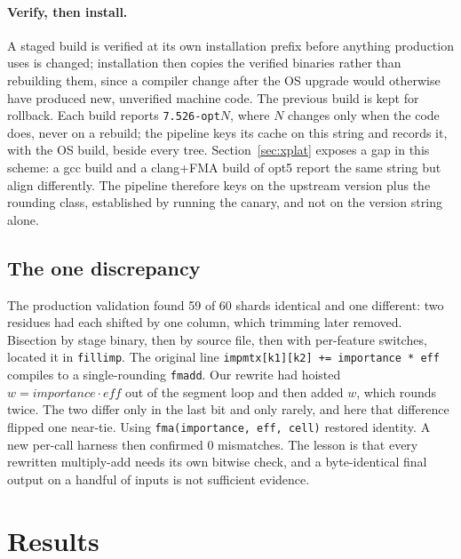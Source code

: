 \documentclass[11pt]{article}
\newcommand{\code}[1]{\texttt{#1}}
\begin{document}
\paragraph{Verify, then install.} A staged build is verified at its own installation prefix
before anything production uses is changed; installation then copies the verified binaries
rather than rebuilding them, since a compiler change after the OS upgrade would otherwise
have produced new, unverified machine code. The previous build is kept for rollback.
\label{sec:provenance}
Each build reports \code{7.526-opt}$N$, where $N$ changes only when the code does, never on a
rebuild; the pipeline keys its cache on this string and records it, with the OS build, beside
every tree. Section~\ref{sec:xplat} exposes a gap in this scheme: a gcc build and a clang+FMA
build of opt5 report the same string but align differently. The pipeline therefore
keys on the upstream version plus the rounding class, established by running the canary, and
not on the version string alone.

\subsection{The one discrepancy}
\label{sec:bug}

The production validation found 59 of 60 shards identical and one different: two residues
had each shifted by one column, which trimming later removed. Bisection by stage binary,
then by source file, then with per-feature switches, located it in \code{fillimp}. The
original line \code{impmtx[k1][k2] += importance * eff} compiles to a single-rounding
\code{fmadd}. Our rewrite had hoisted $w = \mathit{importance}\cdot\mathit{eff}$ out of the
segment loop and then added $w$, which rounds twice. The two differ only in the last bit
and only rarely, and here that difference flipped one near-tie. Using
\code{fma(importance, eff, cell)} restored identity. A new per-call harness then confirmed
0 mismatches. The lesson is that every rewritten multiply-add needs its own bitwise check,
and a byte-identical final output on a handful of inputs is not sufficient evidence.

\section{Results}
\label{sec:results}
\end{document}
